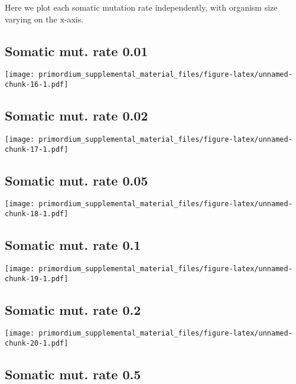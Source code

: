 \documentclass[]{book}
\begin{document}
Here we plot each somatic mutation rate independently, with organism size varying on the x-axis.

\hypertarget{somatic-mut.-rate-0.01}{%
\subsection{Somatic mut. rate 0.01}\label{somatic-mut.-rate-0.01}}

\texttt{[image: primordium\_supplemental\_material\_files/figure-latex/unnamed-chunk-16-1.pdf]}

\hypertarget{somatic-mut.-rate-0.02}{%
\subsection{Somatic mut. rate 0.02}\label{somatic-mut.-rate-0.02}}

\texttt{[image: primordium\_supplemental\_material\_files/figure-latex/unnamed-chunk-17-1.pdf]}

\hypertarget{somatic-mut.-rate-0.05}{%
\subsection{Somatic mut. rate 0.05}\label{somatic-mut.-rate-0.05}}

\texttt{[image: primordium\_supplemental\_material\_files/figure-latex/unnamed-chunk-18-1.pdf]}

\hypertarget{somatic-mut.-rate-0.1}{%
\subsection{Somatic mut. rate 0.1}\label{somatic-mut.-rate-0.1}}

\texttt{[image: primordium\_supplemental\_material\_files/figure-latex/unnamed-chunk-19-1.pdf]}

\hypertarget{somatic-mut.-rate-0.2}{%
\subsection{Somatic mut. rate 0.2}\label{somatic-mut.-rate-0.2}}

\texttt{[image: primordium\_supplemental\_material\_files/figure-latex/unnamed-chunk-20-1.pdf]}

\hypertarget{somatic-mut.-rate-0.5}{%
\subsection{Somatic mut. rate 0.5}\label{somatic-mut.-rate-0.5}}
\end{document}
